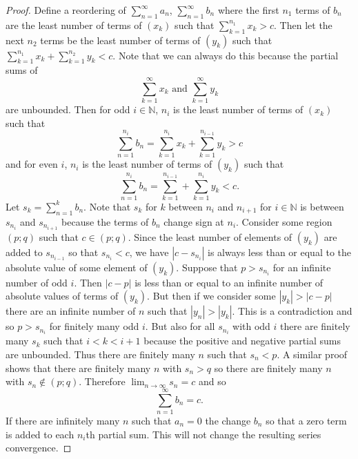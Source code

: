 \documentclass{article}
\begin{document}
\begin{flushleft}
\begin{proof}
Define a reordering of $\sum_{n=1}^{\infty} a_n$, $\sum_{n=1}^{\infty} b_n$ where the first $n_1$ terms of $b_n$ are the least number of terms of $(x_k)$ such that $\sum_{k=1}^{n_1} x_k > c$. Then let the next $n_2$ terms be the least number of terms of $(y_k)$ such that $\sum_{k=1}^{n_1} x_k + \sum_{k=1}^{n_2} y_k < c$. Note that we can always do this because the partial sums of
\[
\sum_{k=1}^{\infty} x_k \text{ and } \sum_{k=1}^{\infty} y_k
\]
are unbounded. Then for odd $i \in \mathbb{N}$, $n_i$ is the least number of terms of $(x_k)$ such that
\[
\sum_{n=1}^{n_i} b_n = \sum_{k=1}^{n_i} x_k + \sum_{k=1}^{n_{i-1}} y_k > c
\]
and for even $i$, $n_i$ is the least number of terms of $(y_k)$ such that
\[
\sum_{n=1}^{n_i} b_n = \sum_{k=1}^{n_{i-1}} + \sum_{k=1}^{n_i} y_k < c.
\]
Let $s_k = \sum_{n=1}^{k} b_n$. Note that $s_k$ for $k$ between $n_i$ and $n_{i+1}$ for $i \in \mathbb{N}$ is between $s_{n_i}$ and $s_{n_{i+1}}$ because the terms of $b_n$ change sign at $n_i$. Consider some region $(p;q)$ such that $c \in (p;q)$. Since the least number of elements of $(y_k)$ are added to $s_{n_{i-1}}$ so that $s_{n_i} < c$, we have $|c - s_{n_i}|$ is always less than or equal to the absolute value of some element of $(y_k)$. Suppose that $p > s_{n_i}$ for an infinite number of odd $i$. Then $|c-p|$ is less than or equal to an infinite number of absolute values of terms of $(y_k)$. But then if we consider some $|y_k| > |c-p|$ there are an infinite number of $n$ such that $|y_n| > |y_k|$. This is a contradiction and so $p > s_{n_i}$ for finitely many odd $i$. But also for all $s_{n_i}$ with odd $i$ there are finitely many $s_k$ such that $i < k < i+1$ because the positive and negative partial sums are unbounded. Thus there are finitely many $n$ such that $s_n < p$. A similar proof shows that there are finitely many $n$ with $s_n > q$ so there are finitely many $n$ with $s_n \notin (p;q)$. Therefore $\lim_{n \rightarrow \infty} s_n = c$ and so
\[
\sum_{n=1}^{\infty} b_n = c.
\]
If there are infinitely many $n$ such that $a_n=0$ the change $b_n$ so that a zero term is added to each $n_i$th partial sum. This will not change the resulting series convergence.
\end{proof}

\end{flushleft}
\end{document}
